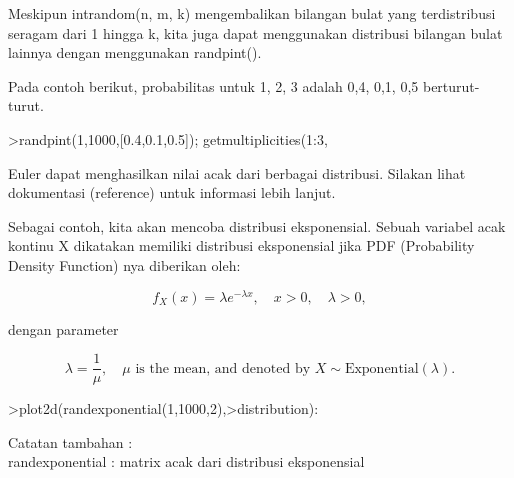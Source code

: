 \documentclass[a4paper,10pt]{article}
\begin{document}
\begin{eulernotebook}
\begin{eulercomment}
Meskipun intrandom(n, m, k) mengembalikan bilangan bulat yang
terdistribusi seragam dari 1 hingga k, kita juga dapat menggunakan
distribusi bilangan bulat lainnya dengan menggunakan randpint().

Pada contoh berikut, probabilitas untuk 1, 2, 3 adalah 0,4, 0,1, 0,5
berturut-turut.
\end{eulercomment}
\begin{eulerprompt}
>randpint(1,1000,[0.4,0.1,0.5]); getmultiplicities(1:3,%
\end{eulerprompt}
\begin{euleroutput}
  [394,  107,  499]
\end{euleroutput}
\begin{eulercomment}
Euler dapat menghasilkan nilai acak dari berbagai distribusi. Silakan
lihat dokumentasi (reference) untuk informasi lebih lanjut.

Sebagai contoh, kita akan mencoba distribusi eksponensial. Sebuah
variabel acak kontinu X dikatakan memiliki distribusi eksponensial
jika PDF (Probability Density Function) nya diberikan oleh:\\
\end{eulercomment}
\begin{eulerformula}
\[
f_X(x)=\lambda e^{-\lambda x},\quad x>0,\quad \lambda>0,
\]
\end{eulerformula}
\begin{eulercomment}
dengan parameter\\
\end{eulercomment}
\begin{eulerformula}
\[
\lambda=\frac{1}{\mu},\quad \mu \text{ is the mean, and denoted by } X \sim \text{Exponential}(\lambda).
\]
\end{eulerformula}
\begin{eulerprompt}
>plot2d(randexponential(1,1000,2),>distribution):
\end{eulerprompt}
\begin{eulercomment}
Catatan tambahan :\\
randexponential : matrix acak dari distribusi eksponensial


\end{eulercomment}
\end{eulernotebook}
\end{document}

